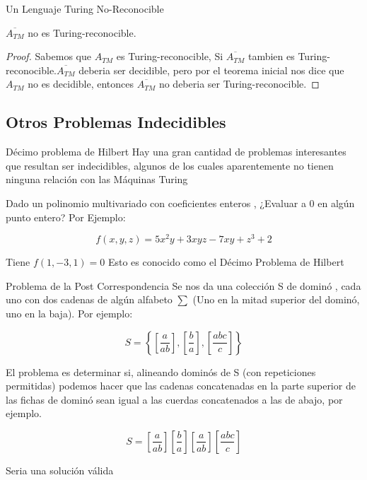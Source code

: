 \documentclass[11pt]{beamer}
\begin{document}
		\begin{frame}{Un Lenguaje Turing No-Reconocible}
			\justifying
			\begin{corollary}
			    $\overline{A_{TM}}$ no es Turing-reconocible.
			\end{corollary}
			\begin{proof}
    			Sabemos que $A_{TM}$ es Turing-reconocible, Si $\overline{A_{TM}}$ tambien es Turing-reconocible.$\overline{A_{TM}}$ deberia ser decidible, pero por el teorema inicial nos dice que $A_{TM}$ no es decidible, entonces $\overline{A_{TM}}$ no deberia ser Turing-reconocible.
			\end{proof}
			
			
		\end{frame}
		
	\subsection{Otros Problemas Indecidibles}
		\begin{frame}{Décimo problema de Hilbert}
			\justifying
			Hay una gran cantidad de problemas interesantes que resultan ser indecidibles, algunos de los cuales aparentemente no tienen ninguna relación con las Máquinas Turing 
			
			Dado un polinomio multivariado con coeficientes enteros \cite{Davis53} \cite{Matiyasevich09}, ¿Evaluar a 0 en algún punto entero? Por Ejemplo:
			
			\begin{equation}\label{eq:poliMulti}
			    f(x, y, z) = 5x^2y + 3xyz - 7xy + z^3 + 2
			\end{equation}
			
			Tiene $f(1, -3, 1) = 0$ Esto es conocido como el Décimo Problema de Hilbert
			
		 \end{frame}
		 
		 \begin{frame}{Problema de la Post Correspondencia}
			\justifying
			Se nos da una colección S de dominó \cite{Davis77}, cada uno con dos cadenas de algún alfabeto $\sum$ (Uno en la mitad superior del dominó, uno en la baja). Por ejemplo:
			
			\begin{equation}\label{eq:post1}
			    S = \left\{ \left[\frac{a}{ab} \right], \left[\frac{b}{a} \right], \left[\frac{abc}{c} \right] \right\}
			\end{equation}
			
			El problema es determinar si, alineando dominós de S (con repeticiones permitidas) podemos hacer que las cadenas concatenadas en la parte superior de las fichas de dominó sean igual a las cuerdas concatenados a las de abajo, por ejemplo.
			
			\begin{equation}\label{eq:post2}
			    S = \left[ \frac{a}{ab} \right] \left[\frac{b}{a}\right] \left[\frac{a}{ab}\right] \left[\frac{abc}{c}\right] 
			\end{equation}
			
			Seria una solución válida
			
		 \end{frame}
		 
\end{document}

